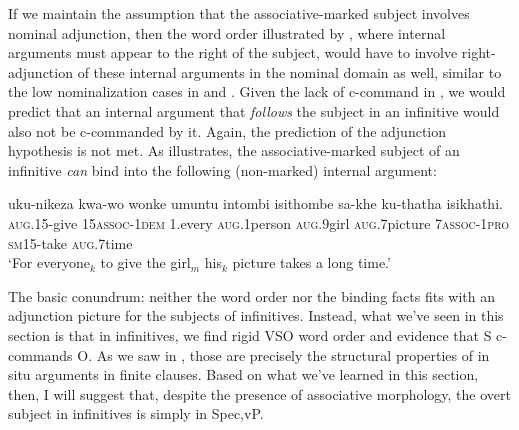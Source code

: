 \documentclass[output=paper,colorlinks,citecolor=brown]{langscibook}
\begin{document}
\ea%
    \label{ex:halpert:16}
    \z 
\z 

If we maintain the assumption that the associative-marked subject involves nominal adjunction, then the word order illustrated by , where internal arguments must appear to the right of the subject, would have to involve right-adjunction of these internal arguments in the nominal domain as well, similar to the low nominalization cases in  and .  Given the lack of c-command in , we would predict that an internal argument that \textit{follows} the subject in an infinitive would also not be c-commanded by it. Again, the prediction of the adjunction hypothesis is not met.  As  illustrates, the associative-marked subject of an infinitive \textit{can} bind into the following (non-marked) internal argument:

\ea%
    \label{ex:halpert:17}
    \gll    uku-nikeza kwa-wo wonke umuntu intombi isithombe sa-khe ku-thatha isikhathi.\\
            \textsc{aug}.15-give 15\textsc{assoc}-1\textsc{dem} 1.every \textsc{aug}.1person \textsc{aug}.9girl \textsc{aug}.7picture 7\textsc{assoc}-1\textsc{pro} \textsc{sm}15-take \textsc{aug}.7time\\
    \glt    `For everyone$_k$ to give the girl$_m$ his$_k$ picture takes a long time.'
\z 

The basic conundrum: neither the word order nor the binding facts fits with an adjunction picture for the subjects of infinitives.  Instead, what we've seen in this section is that in infinitives, we find rigid VSO word order and evidence that S c-commands O.  As we saw in , those are precisely the structural properties of in situ arguments in finite clauses.  Based on what we've learned in this section, then, I will suggest that, despite the presence of associative morphology, the overt subject in infinitives is simply in Spec,vP.
\end{document}
